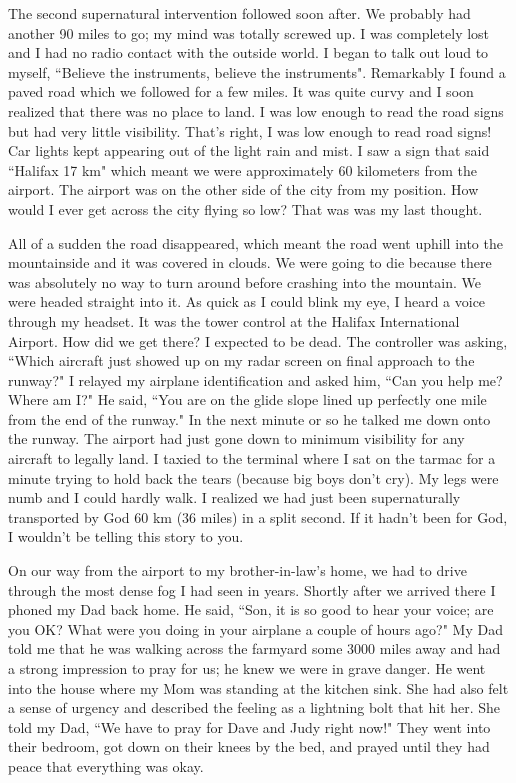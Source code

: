 \documentclass[oneside,12pt]{book}
\begin{document}
The second supernatural intervention followed soon after. We probably had another 90 miles to go; my mind was totally screwed up. I was completely lost and I had no radio contact with the outside world. I began to talk out loud to myself, ``Believe the instruments, believe the instruments". Remarkably I found a paved road which we followed for a few miles. It was quite curvy and I soon realized that there was no place to land. I was low enough to read the road signs but had very little visibility. That's right, I was low enough to read road signs! Car lights kept appearing out of the light rain and mist. I saw a sign that said ``Halifax 17 km" which meant we were approximately 60 kilometers from the airport. The airport was on the other side of the city from my position. How would I ever get across the city flying so low? That was was my last thought. 

All of a sudden the road disappeared, which meant the road went uphill into the mountainside and it was covered in clouds. We were going to die because there was absolutely no way to turn around before crashing into the mountain. We were headed straight into it. As quick as I could blink my eye, I heard a voice through my headset. It was the tower control at the Halifax International Airport. How did we get there? I expected to be dead. The controller was asking, ``Which aircraft just showed up on my radar screen on final approach to the runway?" I relayed my airplane identification and asked him, ``Can you help me? Where am I?" He said, ``You are on the glide slope lined up perfectly one mile from the end of the runway." In the next minute or so he talked me down onto the runway. The airport had just gone down to minimum visibility for any aircraft to legally land. I taxied to the terminal where I sat on the tarmac for a minute trying to hold back the tears (because big boys don't cry). My legs were numb and I could hardly walk. I realized we had just been supernaturally transported by God 60 km (36 miles) in a split second. If it hadn't been for God, I wouldn't be telling this story to you.

On our way from the airport to my brother-in-law's home, we had to drive through the most dense fog I had seen in years. Shortly after we arrived there I phoned my Dad back home. He said, ``Son, it is so good to hear your voice; are you OK? What were you doing in your airplane a couple of hours ago?" My Dad told me that he was walking across the farmyard some 3000 miles away and had a strong impression to pray for us; he knew we were in grave danger. He went into the house where my Mom was standing at the kitchen sink. She had also felt a sense of urgency and described the feeling as a lightning bolt that hit her. She told my Dad, ``We have to pray for Dave and Judy right now!" They went into their bedroom, got down on their knees by the bed, and prayed until they had peace that everything was okay.
\end{document}
